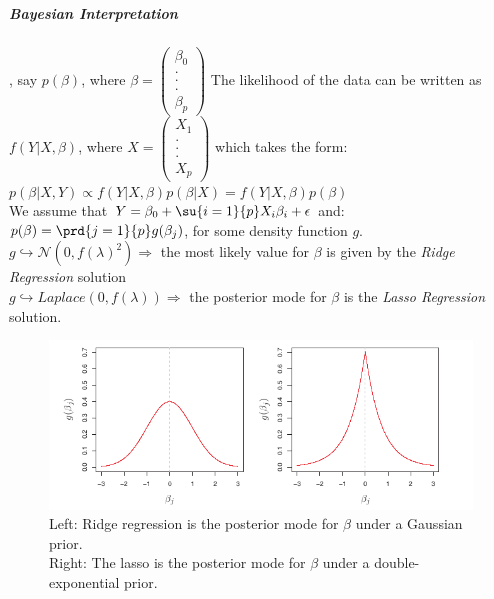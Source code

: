 
\subparagraph{Bayesian Interpretation}
, say $p(\beta)$, where $\beta=
\begin{pmatrix}
	\beta_{0}\\
	.\\
	.\\
	.\\
	\beta_{p}
\end{pmatrix}
$
The likelihood of the data can be written as $f(Y|X,\beta)$, where
$X=
\begin{pmatrix}
	X_{1}\\
	.\\
	.\\
	.\\
	X_{p}
\end{pmatrix}
$
 which takes the
form:\\
$
p(\beta|X,Y)\propto f(Y|X,\beta)p(\beta|X)=f(Y|X,\beta)p(\beta)
$\\
We assume that $Y=\beta_{0}+\su{{i=1}}{p}X_{i}\beta_{i}+\epsilon$ and:
$p(\beta)=\prd{{j=1}}{p}g(\beta_{j})$, for some density function $g$.\\
$g\hookrightarrow\mathcal{N}(0,f(\lambda)^{2})\Rightarrow$ the most
likely value for $\beta$ is given by the \emph{Ridge Regression} 
solution\\
$g\hookrightarrow Laplace(0,f(\lambda))\Rightarrow$ the posterior mode
for $\beta$ is the \emph{Lasso Regression} solution.
\begin{figure}[H]
	\begin{center}
		\includegraphics[width=\textwidth]{./chap/1chap/5sec/images/2bayesianPointOfView.png}
	\end{center}
	\caption{Left: Ridge regression is the posterior mode for 
	$\beta$ under a Gaussian prior.\\
	Right: The lasso is the posterior mode for $\beta$ under a 
	double-exponential prior.}
	\label{fig:2bayesianPointOfView}
\end{figure}
